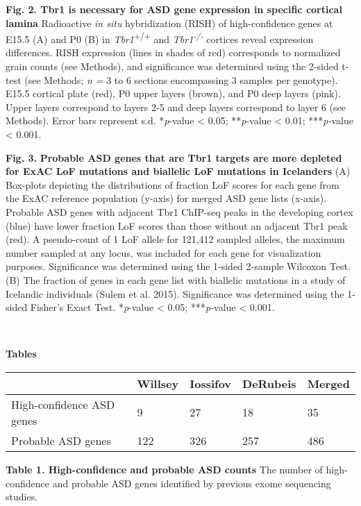 \documentclass[]{article}
\begin{document}
\textbf{Fig. 2. Tbr1 is necessary for ASD gene expression in specific
cortical lamina} Radioactive \emph{in situ} hybridization (RISH) of
high-confidence genes at E15.5 (A) and P0 (B) in
\emph{Tbr1}\textsuperscript{+/+} and \emph{Tbr1\textsuperscript{-/-}}
cortices reveal expression differences. RISH expression (lines in shades
of red) corresponds to normalized grain counts (see Methods), and
significance was determined using the 2-sided t-test (see Methods;
\emph{n =} 3 to 6 sections encompassing 3 samples per genotype). E15.5
cortical plate (red), P0 upper layers (brown), and P0 deep layers
(pink). Upper layers correspond to layers 2-5 and deep layers correspond
to layer 6 (see Methods). Error bars represent s.d. *\emph{p}-value
\textless{} 0.05; **\emph{p}-value \textless{} 0.01; ***\emph{p-}value
\textless{} 0.001.

\textbf{Fig. 3.} \textbf{Probable ASD genes that are Tbr1 targets are
more depleted for ExAC LoF mutations and biallelic LoF mutations in
Icelanders} (A) Box-plots depicting the distributions of fraction LoF
scores for each gene from the ExAC reference population (y-axis) for
merged ASD gene lists (x-axis). Probable ASD genes with adjacent Tbr1
ChIP-seq peaks in the developing cortex (blue) have lower fraction LoF
scores than those without an adjacent Tbr1 peak (red). A pseudo-count of
1 LoF allele for 121,412 sampled alleles, the maximum number sampled at
any locus, was included for each gene for visualization purposes.
Significance was determined using the 1-sided 2-sample Wilcoxon Test.
(B) The fraction of genes in each gene list with biallelic mutations in
a study of Icelandic individuals (Sulem et al. 2015). Significance was
determined using the 1-sided Fisher's Exact Test. *\emph{p}-value
\textless{} 0.05; ***\emph{p-}value \textless{} 0.001.

\textbf{\\
}

\textbf{Tables}

\begin{longtable}[]{@{}lllll@{}}
\toprule
~ & Willsey & Iossifov & DeRubeis & Merged\tabularnewline
\midrule
\endhead
High-confidence ASD genes & 9 & 27 & 18 & 35\tabularnewline
Probable ASD genes & 122 & 326 & 257 & 486\tabularnewline
\bottomrule
\end{longtable}

\textbf{Table 1. High-confidence and probable ASD counts} The number of
high-confidence and probable ASD genes identified by previous exome
sequencing studies.
\end{document}
